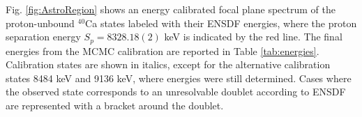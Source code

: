 Fig. \ref{fig:AstroRegion} shows an energy calibrated focal plane spectrum of the proton-unbound $^{40}$Ca states labeled with their ENSDF \cite{Chen2017} energies, where the proton separation energy $S_{p} = 8328.18(2)$ keV \cite{Wang2021} is indicated by the red line. The final energies from the MCMC calibration are reported in Table \ref{tab:energies}. Calibration states are shown in italics, except for the alternative calibration states 8484 keV and 9136 keV, where energies were still determined. Cases where the observed state corresponds to an unresolvable doublet according to ENSDF are represented with a bracket around the doublet.


\begingroup %
  \renewcommand*{\thefootnote}{\alph{footnote}}
  \renewcommand*\footnoterule{} %
